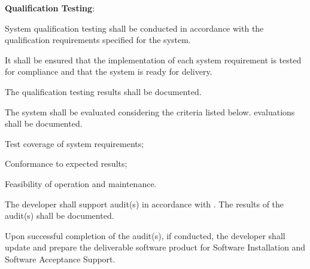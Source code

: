 			\begin{adjustwidth}{2em}{0pt} 

				\begin{compactenum}

					\item {\bf Qualification Testing}:

					\begin{compactenum}

						\item System qualification testing shall be conducted in accordance with the qualification requirements specified for the system. 

						\item It shall be ensured that the implementation of each system requirement is tested for compliance and that the system is ready for delivery.

						\item The qualification testing results shall be documented.

						\item The system shall be evaluated considering the criteria listed below. evaluations shall be documented.

						\begin{compactenum}

							\item Test coverage of system requirements;

							\item Conformance to expected results;

							\item Feasibility of operation and maintenance.

						\end{compactenum}

						\item The developer shall support audit(s) in accordance with . The results of the audit(s) shall be documented.

						\item Upon successful completion of the audit(s), if conducted, the developer shall update and prepare the deliverable software product for Software Installation and Software Acceptance Support.

					\end{compactenum}

				\end{compactenum}

			\end{adjustwidth}


